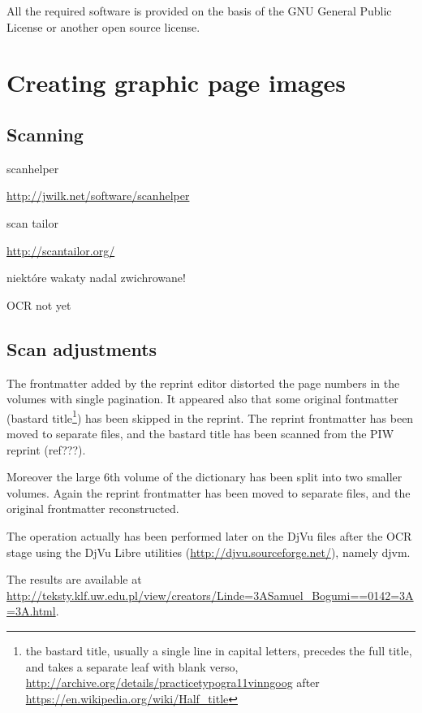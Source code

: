 \documentclass[runningheads,a4paper]{llncs}
\begin{document}
All the required software is provided on the basis of the GNU General
Public License or another open source license.

\section{Creating graphic page images}
\label{sec:creat-page-graph}



\subsection{Scanning}
\label{sec:scanning}

scanhelper

\url{http://jwilk.net/software/scanhelper}

scan tailor

\url{http://scantailor.org/}

niektóre wakaty nadal zwichrowane!

OCR not yet

\subsection{Scan adjustments}
\label{sec:scan-adjustments}

The frontmatter added by the reprint editor distorted the page numbers
in the volumes with single pagination. It appeared also that some
original fontmatter (bastard title\footnote{the bastard title, usually
  a single line in capital letters, precedes the full title, and takes
  a separate leaf with blank verso,
  \url{http://archive.org/details/practicetypogra11vinngoog} after
  \url{https://en.wikipedia.org/wiki/Half_title}}) has been skipped in
the reprint. The reprint frontmatter has been moved to separate files,
and the bastard title has been scanned from the PIW reprint (ref???).

Moreover the large 6th volume of the dictionary has been split into
two smaller volumes. Again the reprint frontmatter has been moved to
separate files, and the original frontmatter reconstructed.

The operation actually has been performed later on the DjVu files
after the OCR stage using the DjVu Libre utilities
(\url{http://djvu.sourceforge.net/}), namely djvm.

The results are available at
\url{http://teksty.klf.uw.edu.pl/view/creators/Linde=3ASamuel_Bogumi==0142=3A=3A.html}.
\end{document}
